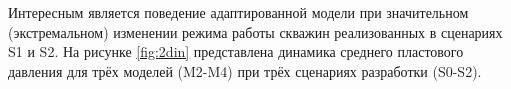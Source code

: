 \documentclass{article}
\begin{document}
Интересным является поведение адаптированной модели при значительном (экстремальном) изменении режима работы скважин реализованных в сценариях S1 и S2. На рисунке \ref{fig:2din} представлена динамика среднего пластового давления для трёх моделей (M2-M4) при трёх сценариях разработки (S0-S2).
\begin{figure}
\end{figure}
\end{document}
